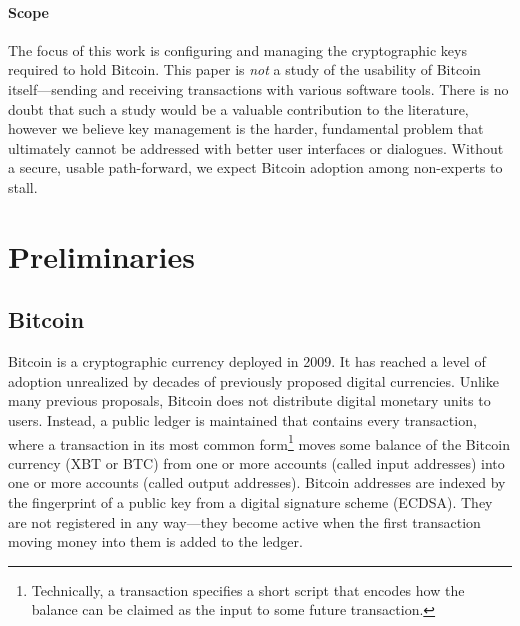 \paragraph{Scope}

The focus of this work is configuring and managing the cryptographic keys required to hold Bitcoin. This paper is \emph{not} a study of the usability of Bitcoin itself---\eg sending and receiving transactions with various software tools. There is no doubt that such a study would be a valuable contribution to the literature, however we believe key management is the harder, fundamental problem that ultimately cannot be addressed with better user interfaces or dialogues. Without a secure, usable path-forward, we expect Bitcoin adoption among non-experts to stall.



\section{Preliminaries}

\subsection{Bitcoin}

Bitcoin is a cryptographic currency deployed in 2009. It has reached a level of adoption unrealized by decades of previously proposed digital currencies. Unlike many previous proposals, Bitcoin does not distribute digital monetary units to users. Instead, a public ledger is maintained that contains every transaction, where a transaction in its most common form\footnote{Technically, a transaction specifies a short script that encodes how the balance can be claimed as the input to some future transaction.} moves some balance of the Bitcoin currency (XBT or BTC) from one or more accounts (called input addresses) into one or more accounts (called output addresses). Bitcoin addresses are indexed by the fingerprint of a public key from a digital signature scheme (ECDSA). They are not registered in any way---they become active when the first transaction moving money into them is added to the ledger. 

